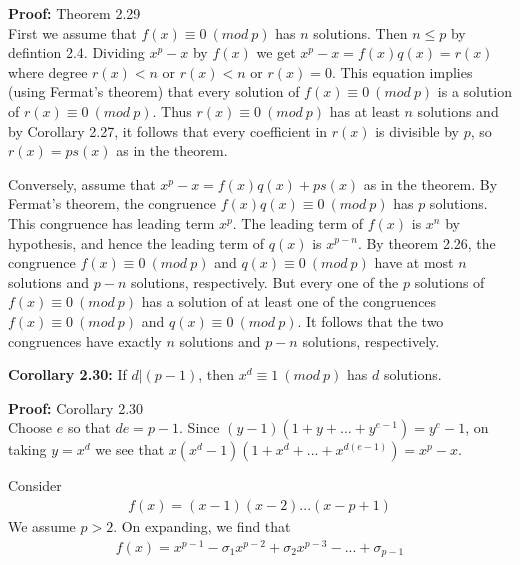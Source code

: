 \documentclass[a4paper]{article}
\begin{document}
\textbf{Proof:} Theorem 2.29\\
First we assume that $f(x)\equiv 0\ (mod\ p)$ has $n$ solutions. Then $n\leq p$ by defintion 2.4. Dividing $x^p-x$ by $f(x)$ we get $x^p-x=f(x)q(x)=r(x)$ where degree $r(x)<n$ or $r(x)<n$ or $r(x)=0$. This equation implies (using Fermat's theorem) that every solution of $f(x)\equiv 0\ (mod\ p)$ is a solution of $r(x)\equiv 0\ (mod\ p)$. Thus $r(x)\equiv 0\ (mod\ p)$ has at least $n$ solutions and by Corollary 2.27, it follows that every coefficient in $r(x)$ is divisible by $p$, so $r(x)=ps(x)$ as in the theorem.

Conversely, assume that $x^p-x=f(x)q(x)+ps(x)$ as in the theorem. By Fermat's theorem, the congruence $f(x)q(x)\equiv 0\ (mod\ p)$ has $p$ solutions. This congruence has leading term $x^p$. The leading term of $f(x)$ is $x^n$ by hypothesis, and hence the leading term of $q(x)$ is $x^{p-n}$. By theorem 2.26, the congruence $f(x)\equiv 0\ (mod\ p)$ and $q(x)\equiv 0\ (mod\ p)$ have at most $n$ solutions and $p-n$ solutions, respectively. But every one of the $p$ solutions of $f(x)\equiv 0\ (mod\ p)$ has a solution of at least one of the congruences $f(x)\equiv 0\ (mod\ p)$ and $q(x)\equiv 0\ (mod\ p)$. It follows that the two congruences have exactly $n$ solutions and $p-n$ solutions, respectively.

\textbf{Corollary 2.30:}
If $d|(p-1)$, then $x^d\equiv 1\ (mod\ p)$ has $d$ solutions.

\textbf{Proof:} Corollary 2.30\\
Choose $e$ so that $de=p-1$. Since $(y-1)(1+y+...+y^{e-1})=y^e-1$, on taking $y=x^d$ we see that $x(x^d-1)(1+x^d+...+x^{d(e-1)})=x^p-x$.

Consider
\begin{align*}
    f(x)=(x-1)(x-2)...(x-p+1)
\end{align*}
We assume $p>2$. On expanding, we find that
\begin{align}
    f(x)=x^{p-1}-\sigma_{1}x^{p-2}+\sigma_{2}x^{p-3}-...+\sigma_{p-1}
\end{align}
\end{document}
